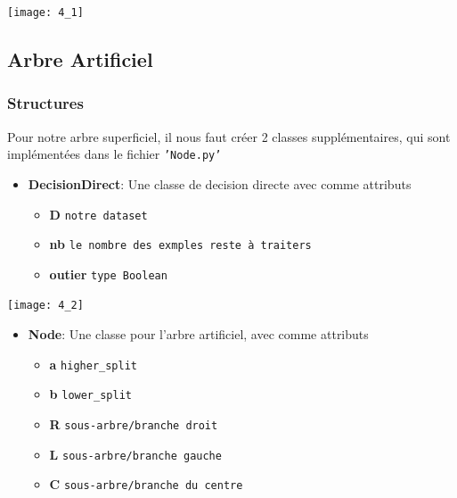 \documentclass[a4paper]{article}
\begin{document}
\texttt{[image: 4\_1]}\\






\subsection{Arbre Artificiel}

\subsubsection{Structures}

Pour notre arbre superficiel, il nous faut créer 2 classes supplémentaires, qui sont
implémentées dans le fichier \texttt{'Node.py'}
\\


\begin{itemize}
\item
  \textbf{DecisionDirect}: Une classe de decision directe avec comme
  attributs

  \begin{itemize}
  \itemsep1pt\parskip0pt
  \item
    \textbf{D} \texttt{notre dataset}
  \item
    \textbf{nb} \texttt{le nombre des exmples reste à traiters}
  \item
    \textbf{outier} \texttt{type Boolean\\}
  \end{itemize}
\end{itemize}

\texttt{[image: 4\_2]}
\\
\begin{itemize}
\item
  \textbf{Node}: Une classe pour l'arbre artificiel, avec comme
  attributs
  \begin{itemize}
  \itemsep1pt\parskip0pt
  \item
    \textbf{a} \texttt{higher\_split}
  \item
    \textbf{b} \texttt{lower\_split}
  \item
    \textbf{R} \texttt{sous-arbre/branche droit}
  \item
    \textbf{L} \texttt{sous-arbre/branche gauche}
  \item
    \textbf{C} \texttt{sous-arbre/branche du centre}
  \end{itemize}
\end{itemize}
\end{document}
